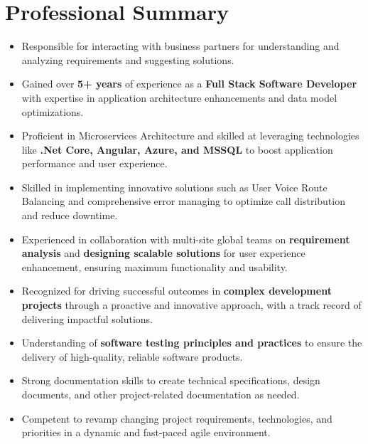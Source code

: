 \section{\textbf{Professional Summary}}
\begin{itemize}
      \small
      \setlength{\itemsep}{0pt}
      \setlength{\parskip}{0pt}
      \setlength{\parsep}{0pt}
      \item Responsible for interacting with business partners for understanding and analyzing requirements and suggesting solutions.
      \item Gained over \textbf{5+ years} of experience as a \textbf{Full Stack Software Developer} with expertise in
            application architecture enhancements and data model optimizations.
      \item Proficient in Microservices Architecture and skilled at leveraging technologies like \textbf{.Net Core, Angular, Azure, and MSSQL} to boost application performance and user experience.
      \item Skilled in implementing innovative solutions such as User Voice Route Balancing and
            comprehensive error managing to optimize call distribution and reduce downtime.
      \item Experienced in collaboration with multi-site global teams on \textbf{requirement analysis} and \textbf{designing scalable solutions}
            for user experience enhancement, ensuring maximum functionality and usability.
      \item Recognized for driving successful outcomes in \textbf{complex development projects}
            through a proactive and innovative approach, with a track record of delivering
            impactful solutions.
      \item Understanding of \textbf{software testing principles and practices} to ensure the delivery of
            high-quality, reliable software products.
      \item Strong documentation skills to create technical specifications, design documents, and
            other project-related documentation as needed.
      \item Competent to revamp changing project requirements, technologies, and priorities in
            a dynamic and fast-paced agile environment.
\end{itemize}